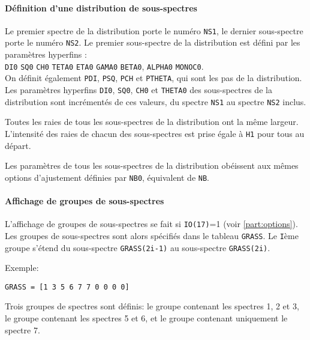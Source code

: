 \paragraph{Définition d'une distribution de sous-spectres}
Le premier spectre de la distribution porte le numéro \lstinline{NS1}, le dernier sous-spectre porte le numéro \lstinline{NS2}.
Le premier sous-spectre de la distribution  est défini par les paramètres hyperfins : \\

\lstinline{DI0} \lstinline{SQ0} \lstinline{CH0} \lstinline{TETA0} \lstinline{ETA0} \lstinline{GAMA0} \lstinline{BETA0}, \lstinline{ALPHA0} \lstinline{MONOC0}. \\

On définit également \lstinline{PDI}, \lstinline{PSQ}, \lstinline{PCH} et \lstinline{PTHETA}, qui sont les pas de la distribution.
Les paramètres hyperfins \lstinline{DI0}, \lstinline{SQ0}, \lstinline{CH0} et \lstinline{THETA0} des sous-spectres de la distribution  sont incrémentés de ces valeurs, du spectre \lstinline{NS1} au spectre \lstinline{NS2} inclus.

Toutes les raies de tous les sous-spectres de la distribution ont la même largeur.
 L'intensité des raies de chacun des sous-spectres est prise égale à \lstinline{H1} pour tous au départ.

Les paramètres de tous les sous-spectres de la distribution obéissent aux mêmes options d'ajustement définies par \lstinline{NB0}, équivalent de \lstinline{NB}.

\paragraph{Affichage de groupes de sous-spectres}
L'affichage de groupes de sous-spectres se fait si  \lstinline{IO(17)}=1 (voir \ref{part:options}). 
Les groupes de sous-spectres sont alors spécifiés dans le tableau \lstinline{GRASS}. 
Le \lstinline{I}ème groupe s'étend du sous-spectre \lstinline{GRASS(2i-1)} au sous-spectre \lstinline{GRASS(2i)}.

Exemple: 

\lstinline{GRASS = [1 3 5 6 7 7 0 0 0 0]}

Trois groupes de spectres sont définis: le groupe contenant les spectres 1, 2 et 3, le groupe contenant les spectres 5 et 6, et le groupe contenant uniquement le spectre 7. 


\FloatBarrier
